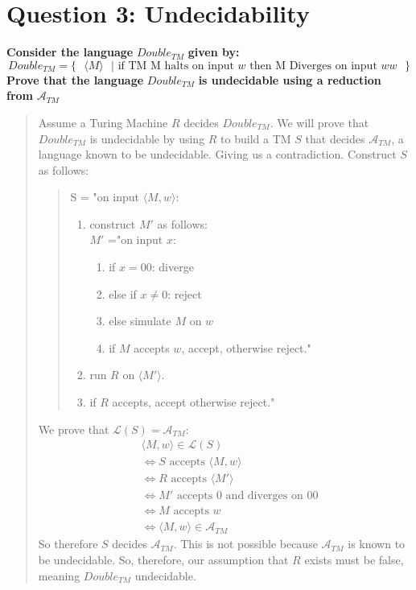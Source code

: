 \section*{Question 3: Undecidability}
    \textbf{Consider the language }$Double_{TM}$\textbf{ given by:}
    \begin{displaymath}
        Double_{TM} = \{ \text{ } \langle M \rangle \text{ } | \text{ if TM M halts on input }w\text{ then M Diverges on input }ww\text{ }\}
    \end{displaymath}
    \textbf{Prove that the language }$Double_{TM}$\textbf{ is undecidable using a reduction from }$\mathcal{A}_{TM}$
    \medskip
    \begin{quote}
        Assume a Turing Machine $R$ decides $Double_{TM}$. We will prove that $Double_{TM}$ is undecidable by using $R$ to build a TM $S$ that decides $\mathcal{A}_{TM}$, a language known to be undecidable. Giving us a contradiction. Construct $S$ as follows:
        \begin{quote}
            S = "on input $\langle M, w\rangle$:
                \begin{enumerate}
                    \item construct $M'$ as follows:\\
                        $M'$ ="on input $x$:
                        \begin{enumerate}
                            \item if $x=00$: diverge
                            \item else if $x\neq0$: reject
                            \item else simulate $M$ on $w$ 
                            \item if $M$ accepts $w$, accept, otherwise reject."
                        \end{enumerate}
                    \item run $R$ on $\langle M'\rangle$.
                    \item if $R$ accepts, accept otherwise reject."
                \end{enumerate}
        \end{quote}
        \medskip
        We prove that $\mathcal{L}(S) = \mathcal{A}_{TM}$:
        \begin{align}
            &\langle M, w \rangle\in\mathcal{L}(S)
            \\&\Leftrightarrow S\text{ accepts }\langle M, w\rangle\
            \\&\Leftrightarrow R\text{ accepts }\langle M'\rangle\
            \\&\Leftrightarrow M'\text{ accepts }0\text{ and diverges on 00}
            \\&\Leftrightarrow M\text{ accepts }w
            \\&\Leftrightarrow\langle M, w\rangle\in\mathcal{A}_{TM}
        \end{align}
        \medskip
        So therefore $S$ decides $\mathcal{A}_{TM}$. This is not possible because $\mathcal{A}_{TM}$ is known to be undecidable. So, therefore, our assumption that $R$ exists must be false, meaning $Double_{TM}$ undecidable.
    \end{quote}